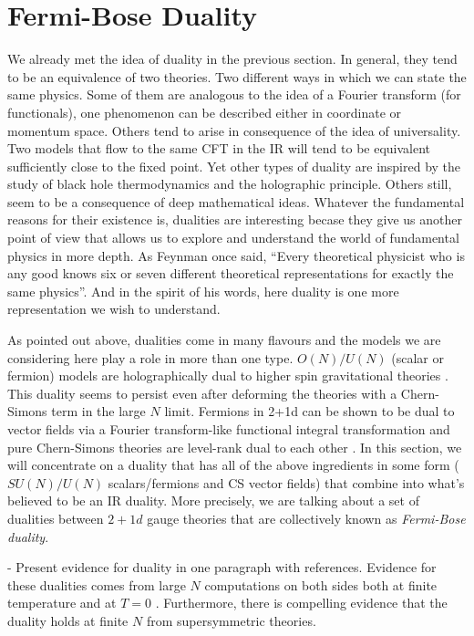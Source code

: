         \section{Fermi-Bose Duality} \label{Fermi-Bose_sec}
        We already met the idea of duality in the previous section. In general, they tend to be an equivalence of two theories. Two different ways in which we can state the same physics. Some of them are analogous to the idea of a Fourier transform (for functionals), one phenomenon can be described either in coordinate or momentum space. Others tend to arise in consequence of the idea of universality. Two models that flow to the same CFT in the IR will tend to be equivalent sufficiently close to the fixed point.
        Yet other types of duality are inspired by the study of black hole thermodynamics and the holographic principle. Others still, seem to be a consequence of deep mathematical ideas. Whatever the fundamental reasons for their existence is, dualities are interesting becase they give us another point of view that allows us to explore and understand the world of fundamental physics in more depth. As Feynman once said, ``Every theoretical physicist who is any good knows six or seven different theoretical representations for exactly the same physics''\cite{Feynman_quote}. And in the spirit of his words, here duality is one more representation we wish to understand.

        As pointed out above, dualities come in many flavours and the models we are considering here play a role in more than one type. $O(N)/U(N)$ (scalar or fermion) models are holographically dual to higher spin gravitational theories \cite{hep-th/0210114}. This duality seems to persist even after deforming the theories with a Chern-Simons term in the large $N$ limit\cite{1110.4382}. Fermions in 2+1d can be shown to be dual to vector fields via a Fourier transform-like functional integral transformation and pure Chern-Simons theories are level-rank dual to each other \cite{hep-th/9401105}\cite{Barci1996}. In this section, we will concentrate on a duality that has all of the above ingredients in some form ($SU(N)/U(N)$ scalars/fermions and CS vector fields) that combine into what's believed to be an IR duality. More precisely, we are talking about a set of dualities between $2+1d$ gauge theories that are collectively known as \textit{Fermi-Bose duality}.

        - Present evidence for duality in one paragraph with references. Evidence for these dualities comes from large $N$ computations on both sides both at finite temperature \cite{1211.4843}  and at $T=0$ \cite{1110.4386}. Furthermore, there is compelling evidence that the duality holds at finite $N$ from supersymmetric theories\cite{0808.0360}.

